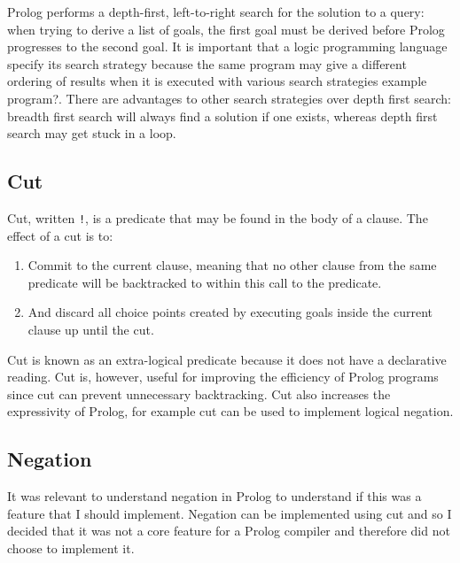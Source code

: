 \documentclass[12pt,a4paper]{report}
\begin{document}
Prolog performs a depth-first, left-to-right search for the solution to a query: when trying to derive a list of goals, the first goal must be derived before Prolog progresses to the second goal. It is important that a logic programming language specify its search strategy because the same program may give a different ordering of results when it is executed with various search strategies {\color{red} example program?}. 
There are advantages to other search strategies over depth first search: breadth first search will always find a solution if one exists, whereas depth first search may get stuck in a loop. 








\subsection{Cut}

Cut, written \texttt{!}, is a predicate that  may be found in the body of a clause. The effect of a cut is to:
\begin{enumerate}
\item Commit to the current clause, meaning that no other clause from the same predicate will be backtracked to within this call to the predicate.
\item And discard all choice points created by executing goals inside the current clause up until the cut.
\end{enumerate}

Cut is known as an extra-logical predicate because it does not have a declarative reading. Cut is, however, useful for improving the efficiency of Prolog programs since cut can prevent unnecessary backtracking. Cut also increases the expressivity of Prolog, for example cut can be used to implement logical negation.

\subsection{Negation}

It was relevant to understand negation in Prolog to understand if this was a feature that I should implement. Negation can be implemented using cut and so I decided that it was not a core feature for a Prolog compiler and therefore did not choose to implement it.
\end{document}
